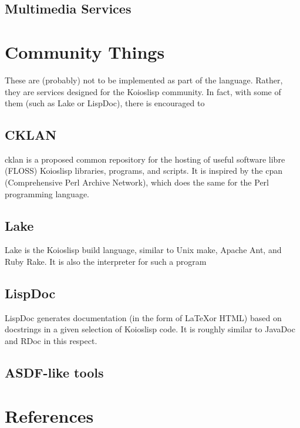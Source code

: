 \documentclass[10pt]{book}
\begin{document}
\section{Multimedia Services}
\chapter{Community Things}
These are (probably) not to be implemented as part of the language. Rather, they are services designed for the Koioslisp community. In fact, with some of them (such as Lake or LispDoc), there is encouraged to 
\section{CKLAN} 
{\sc cklan} is a proposed common repository for the hosting of useful software libre (FLOSS) {\sc Koioslisp} libraries, programs, and scripts. It is inspired by the {\sc cpan} (Comprehensive Perl Archive Network), which does the same for the Perl programming language.
\section{Lake}
Lake is the Koioslisp build language, similar to Unix make, Apache Ant, and Ruby Rake. It is also the interpreter for such a program
\section{LispDoc}
LispDoc generates documentation (in the form of \LaTeX or HTML) based on docstrings in a given selection of Koioslisp code. It is roughly similar to JavaDoc and RDoc in this respect.
\section{ASDF-like tools} 
\chapter{References} 
\end{document}
